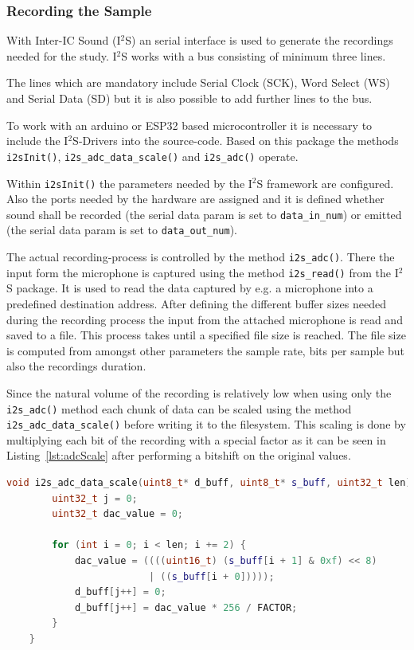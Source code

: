 \subsubsection{Recording the Sample}
With Inter-IC Sound (I$^2$S) an serial interface is used to generate the recordings needed for the study.
I$^2$S works with a bus consisting of minimum three lines.

The lines which are mandatory include Serial Clock (SCK), Word Select (WS) and Serial Data (SD) but it is also possible to add further lines to the bus.  

To work with an arduino or ESP32 based microcontroller it is necessary to include the I$^2$S-Drivers into the source-code.
Based on this package the methods\texttt{ i2sInit()}, \texttt{i2s\_adc\_data\_scale()} and \texttt{i2s\_adc()} operate.

Within \texttt{i2sInit()} the parameters needed by the I$^2$S framework are configured.
Also the ports needed by the hardware are assigned and it is defined whether sound shall be recorded (the serial data param is set to \texttt{data\_in\_num}) or emitted (the serial data param is set to \texttt{data\_out\_num}).

The actual recording-process is controlled by the method \texttt{i2s\_adc()}.
There the input form the microphone is captured using the method \texttt{i2s\_read()} from the I$^2$S package.
It is used to read the data captured by e.g. a microphone into a predefined destination address.
After defining the different buffer sizes needed during the recording process the input from the attached microphone is read and saved to a file.
This process takes until a specified file size is reached.
The file size is computed from amongst other parameters the sample rate, bits per sample but also the recordings duration.  

Since the natural volume of the recording is relatively low when using only the \texttt{i2s\_adc()} method each chunk of data can be scaled using the method \texttt{i2s\_adc\_data\_scale()} before writing it to the filesystem.
This scaling is done by multiplying each bit of the recording with a special factor as it can be seen in Listing~\ref{lst:adcScale} after performing a bitshift on the original values.
\begin{lstlisting}[frame=single, language={c++}, style=style,
	caption={The function which is used to scale the captured recordings volume.}, label={lst:adcScale},float=!htb]	
	void i2s_adc_data_scale(uint8_t* d_buff, uint8_t* s_buff, uint32_t len) {
		uint32_t j = 0;
		uint32_t dac_value = 0;
		
		for (int i = 0; i < len; i += 2) {
			dac_value = ((((uint16_t) (s_buff[i + 1] & 0xf) << 8)
						 | ((s_buff[i + 0]))));
			d_buff[j++] = 0;
			d_buff[j++] = dac_value * 256 / FACTOR;
		}
	}	
\end{lstlisting}

